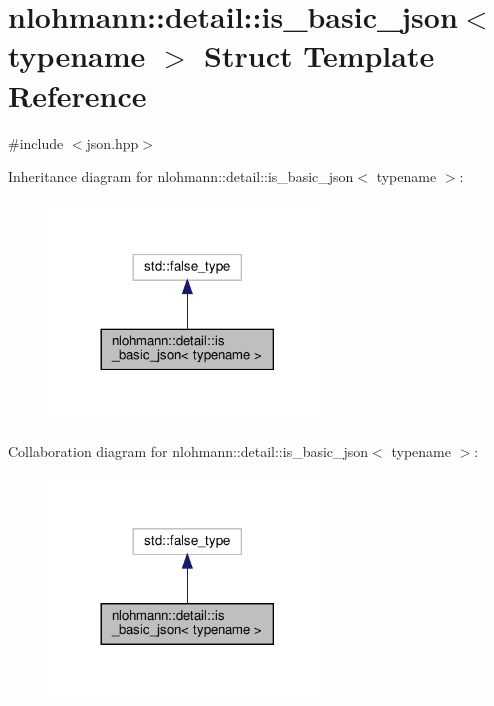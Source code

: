 \hypertarget{structnlohmann_1_1detail_1_1is__basic__json}{}\section{nlohmann\+:\+:detail\+:\+:is\+\_\+basic\+\_\+json$<$ typename $>$ Struct Template Reference}
\label{structnlohmann_1_1detail_1_1is__basic__json}


{\ttfamily \#include $<$json.\+hpp$>$}



Inheritance diagram for nlohmann\+:\+:detail\+:\+:is\+\_\+basic\+\_\+json$<$ typename $>$\+:
\nopagebreak
\begin{figure}[H]
\begin{center}
\leavevmode
\includegraphics[width=209pt]{structnlohmann_1_1detail_1_1is__basic__json__inherit__graph}
\end{center}
\end{figure}


Collaboration diagram for nlohmann\+:\+:detail\+:\+:is\+\_\+basic\+\_\+json$<$ typename $>$\+:
\nopagebreak
\begin{figure}[H]
\begin{center}
\leavevmode
\includegraphics[width=209pt]{structnlohmann_1_1detail_1_1is__basic__json__coll__graph}
\end{center}
\end{figure}


